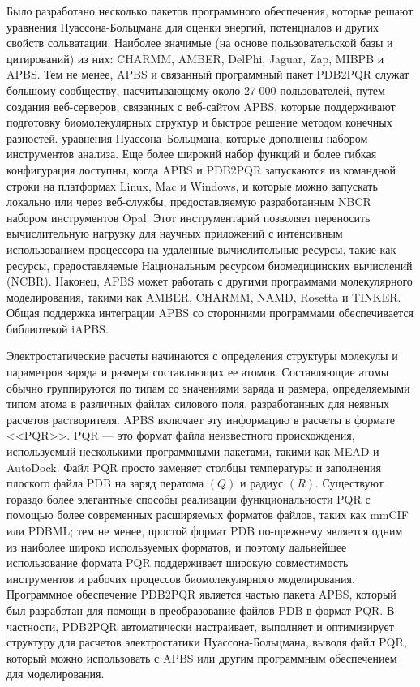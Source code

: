 Было разработано несколько пакетов программного обеспечения, которые решают уравнения Пуассона-Больцмана для оценки энергий, потенциалов и других свойств сольватации. Наиболее значимые (на основе пользовательской базы и цитирований) из них: CHARMM, AMBER, DelPhi, Jaguar, Zap, MIBPB и APBS. Тем не менее, APBS и связанный программный пакет PDB2PQR служат большому сообществу, насчитывающему около 27 000 пользователей, путем создания веб-серверов, связанных с веб-сайтом APBS, которые поддерживают подготовку биомолекулярных структур и быстрое решение методом конечных разностей. уравнения Пуассона–Больцмана, которые дополнены набором инструментов анализа. Еще более широкий набор функций и более гибкая конфигурация доступны, когда APBS и PDB2PQR запускаются из командной строки на платформах Linux, Mac и Windows, и которые можно запускать локально или через веб-службы, предоставляемую разработанным NBCR набором инструментов Opal. Этот инструментарий позволяет переносить вычислительную нагрузку для научных приложений с интенсивным использованием процессора на удаленные вычислительные ресурсы, такие как ресурсы, предоставляемые Национальным ресурсом биомедицинских вычислений (NCBR). Наконец, APBS может работать с другими программами молекулярного моделирования, такими как AMBER, CHARMM, NAMD, Rosetta и TINKER. Общая поддержка интеграции APBS со сторонними программами обеспечивается библиотекой iAPBS.

Электростатические расчеты начинаются с определения структуры молекулы и параметров заряда и размера составляющих ее атомов. Составляющие атомы обычно группируются по типам со значениями заряда и размера, определяемыми типом атома в различных файлах силового поля, разработанных для неявных расчетов растворителя. APBS включает эту информацию в расчеты в формате <<PQR>>. PQR — это формат файла неизвестного происхождения, используемый несколькими программными пакетами, такими как MEAD и AutoDock. Файл PQR просто заменяет столбцы температуры и заполнения плоского файла PDB на заряд ператома $(Q)$ и радиус $(R)$. Существуют гораздо более элегантные способы реализации функциональности PQR с помощью более современных расширяемых форматов файлов, таких как mmCIF или PDBML; тем не менее, простой формат PDB по-прежнему является одним из наиболее широко используемых форматов, и поэтому дальнейшее использование формата PQR поддерживает широкую совместимость инструментов и рабочих процессов биомолекулярного моделирования. Программное обеспечение PDB2PQR является частью пакета APBS, который был разработан для помощи в преобразование файлов PDB в формат PQR. В частности, PDB2PQR автоматически настраивает, выполняет и оптимизирует структуру для расчетов электростатики Пуассона-Больцмана, выводя файл PQR, который можно использовать с APBS или другим программным обеспечением для моделирования.



